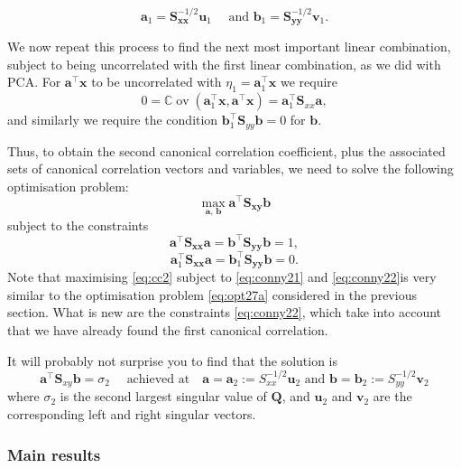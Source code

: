 \documentclass[
]{book}
\theoremstyle{definition}
\theoremstyle{definition}
\theoremstyle{definition}
\theoremstyle{definition}
\theoremstyle{remark}
\begin{document}
\[\mathbf a_1=\mathbf S_{\mathbf x\mathbf x}^{-1/2}\mathbf u_1 \quad\mbox{ and } \mathbf b_1=\mathbf S_{\mathbf y\mathbf y}^{-1/2}\mathbf v_1.\]

We now repeat this process to find the next most important linear combination, subject to being uncorrelated with the first linear combination, as we did with PCA. For \(\mathbf a^\top \mathbf x\) to be uncorrelated with \(\eta_1 = \mathbf a_1^\top \mathbf x\) we require
\[0 = {\mathbb{C}\operatorname{ov}}(\mathbf a_1^\top \mathbf x, \mathbf a^\top \mathbf x) = \mathbf a_1^\top \mathbf S_{xx}\mathbf a,\]
and similarly we require the condition \(\mathbf b_1^\top \mathbf S_{yy} \mathbf b=0\) for \(\mathbf b\).

Thus, to obtain the second canonical correlation coefficient, plus the associated sets of canonical correlation vectors and variables, we need to solve the following optimisation problem:
\begin{equation}
\max_{\mathbf a,\, \mathbf b} \mathbf a^\top \mathbf S_{\mathbf x\mathbf y}\mathbf b
\label{eq:cc2}
\end{equation}
subject to the constraints
\begin{equation}
\mathbf a^\top \mathbf S_{\mathbf x\mathbf x}\mathbf a= \mathbf b^\top \mathbf S_{\mathbf y\mathbf y}\mathbf b=1,
\label{eq:conny21}
\end{equation}
\begin{equation}
\mathbf a_1^\top \mathbf S_{\mathbf x\mathbf x} \mathbf a= \mathbf b_1^\top \mathbf S_{\mathbf y\mathbf y}\mathbf b=0.
\label{eq:conny22}
\end{equation}
Note that maximising \eqref{eq:cc2} subject to \eqref{eq:conny21} and \eqref{eq:conny22}is very similar to the optimisation problem \eqref{eq:opt27a} considered in the previous section.
What is
new are the constraints \eqref{eq:conny22}, which take into account that we have already found the first canonical correlation.

It will probably not surprise you to find that the solution is
\[\mathbf a^\top \mathbf S_{xy}\mathbf b= \sigma_2\quad\mbox{ achieved at} \quad \mathbf a=\mathbf a_2 := S_{xx}^{-1/2}\mathbf u_2 \mbox{ and } \mathbf b=\mathbf b_2 := S_{yy}^{-1/2}\mathbf v_2\]
where \(\sigma_2\) is the second largest singular value of \(\mathbf Q\), and \(\mathbf u_2\) and \(\mathbf v_2\) are the corresponding left and right singular vectors.

\subsubsection*{Main results}\label{main-results}
\end{document}
